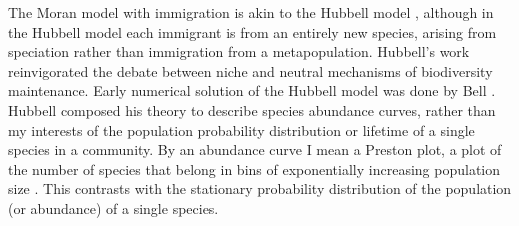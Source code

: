 The Moran model with immigration is akin to the Hubbell model \cite{Hubbell2001}, although in the Hubbell model each immigrant is from an entirely new species, arising from speciation rather than immigration from a metapopulation. %
Hubbell's work reinvigorated the debate between niche and neutral mechanisms of biodiversity maintenance. 
Early numerical solution of the Hubbell model was done by Bell \cite{Bell2001}. %
Hubbell composed his theory to describe species abundance curves, rather than my interests of the population probability distribution or lifetime of a single species in a community. 
By an abundance curve I mean a Preston plot, a plot of the number of species that belong in bins of exponentially increasing population size \cite{Hubbell2001}. 
This contrasts with the stationary probability distribution of the population (or abundance) of a single species. 

